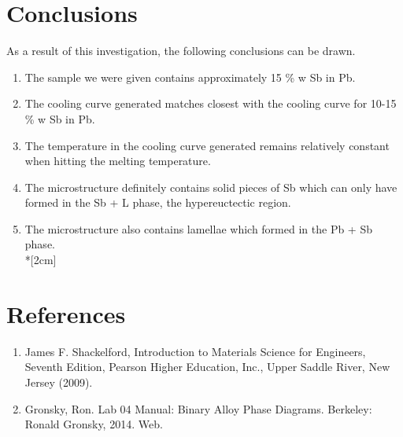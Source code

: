 \documentclass{article}
\begin{document}
\section{Conclusions}
As a result of this investigation, the following conclusions can be drawn.
\begin{enumerate}
\item The sample we were given contains approximately 15 \% w Sb in Pb.
\item The cooling curve generated matches closest with the cooling curve for 10-15 \% w Sb in Pb.
\item The temperature in the cooling curve generated remains relatively constant when hitting the melting temperature.
\item The microstructure definitely contains solid pieces of Sb which can only have formed in the Sb + L phase, the hypereuctectic region.
\item The microstructure also contains lamellae which formed in the Pb + Sb phase. \\*[2cm]
\end{enumerate}


\section{References}
\begin{enumerate}
\item James F. Shackelford, Introduction to Materials Science for Engineers, Seventh Edition, Pearson Higher 
Education, Inc., Upper Saddle River, New Jersey (2009).
\item Gronsky, Ron. Lab 04 Manual: Binary Alloy Phase Diagrams. Berkeley: Ronald Gronsky, 2014. Web.
\end{enumerate}








\end{document}
